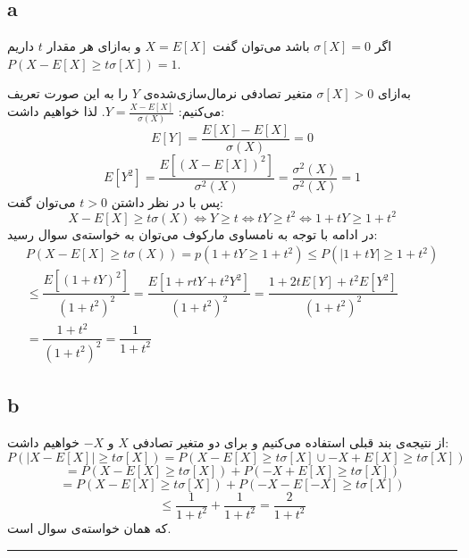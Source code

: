 \documentclass{article}
\begin{document}
\subsection*{a}
اگر
$\sigma \left[ X\right] =0$
باشد می‌توان گفت
$X = E \left[ X\right]$
و به‌ازای هر مقدار
$t$
داریم
$P(X - E \left[ X\right] \geq t \sigma \left[ X\right]) = 1$.

به‌ازای 
$\sigma \left[ X\right] > 0$
متغیر تصادفی نرمال‌سازی‌شده‌ی 
$Y$
را به این صورت تعریف می‌کنیم:
$Y = \frac{X - E \left[ X\right]}{\sigma (X)}$.
لذا خواهیم داشت:
$$E\left[ Y\right] =\dfrac{E\left[ X\right] -E\left[ X\right] }{\sigma \left( X\right) }=0$$
$$E\left[ Y^{2}\right] =\dfrac{E\left[ \left( X-E\left[ X\right] \right) ^{2}\right] }{\sigma ^{2}\left( X\right) }=\dfrac{\sigma ^{2}\left( X\right) }{\sigma ^{2}\left( X\right) }=1$$
پس با در نظر داشتن
$t > 0$
می‌توان گفت:
$$X-E\left[ X\right] \geq t\sigma \left( X\right) \Leftrightarrow Y\geq t\Leftrightarrow tY\geq t^{2}\Leftrightarrow 1+tY\geq 1+t^{2}$$
در ادامه با توجه به نامساوی مارکوف می‌توان به خواسته‌ی سوال رسید:
$$\begin{aligned}P\left( X-E\left[ X\right] \geq t\sigma \left( X\right) \right) =p\left( 1+tY\geq 1+t^{2}\right) \leq P\left( \left| 1+tY\right| \geq 1+t^{2}\right) \\ \leq \dfrac{E\left[ \left( 1+tY\right) ^{2}\right] }{\left( 1+t^{2}\right) ^{2}}=\dfrac{E\left[ 1+rtY+t^{2}Y^{2}\right] }{\left( 1+t^{2}\right) ^{2}}=\dfrac{1+2tE\left[ Y\right] +t^{2}E\left[ Y^{2}\right] }{\left( 1+t^{2}\right) ^{2}}\\ =\dfrac{1+t^{2}}{\left( 1+t^{2}\right) ^{2}}=\dfrac{1}{1+t^{2}}\end{aligned}$$

\subsection*{b}
از نتیجه‌ی بند قبلی استفاده می‌کنیم و برای دو متغیر تصادفی
$X$
و
$-X$
خواهیم داشت:
$$P\left( \left| X-E\left[ X\right] \right| \geq t\sigma \left[ X\right] \right) =P\left( X-E\left[ X\right] \geq t\sigma \left[ X\right] \cup -X+E\left[ X\right] \geq t\sigma \left[ X\right] \right) $$
$$=P( X-E\left[ X\right] \geq t\sigma \left[ X\right] ) +P( -X+E\left[ X\right] \geq t\sigma \left[ X\right] )$$
$$=P( X-E\left[ X\right] \geq t\sigma \left[ X\right] ) +P( -X-E\left[ -X\right] \geq t\sigma \left[ X\right] )$$
$$\leq \dfrac{1}{1+t^{2}}+\dfrac{1}{1+t^{2}}=\dfrac{2}{1+t^{2}}$$
که همان خواسته‌ی سوال است.

\rule{\linewidth}{1pt}
\end{document}
